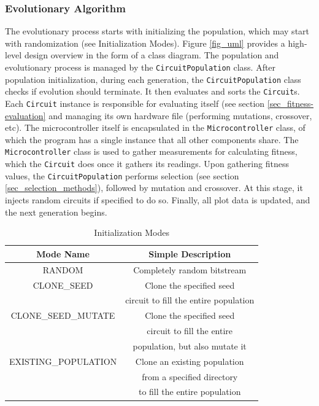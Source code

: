 \documentclass{ieeeaccess}
\begin{document}
\subsubsection{Evolutionary Algorithm}
The evolutionary process starts with initializing the population, which may start with randomization (see Initialization Modes). Figure \ref{fig_uml} provides a high-level design overview in the form of a class diagram. The population and evolutionary process is managed by the \texttt{CircuitPopulation} class. After population initialization, during each generation, the \texttt{CircuitPopulation} class checks if evolution should terminate. It then evaluates and sorts the \texttt{Circuit}s. Each \texttt{Circuit} instance is responsible for evaluating itself (see section \ref{sec_fitness-evaluation} and managing its own hardware file (performing mutations, crossover, etc). The microcontroller itself is encapsulated in the \texttt{Microcontroller} class, of which the program has a single instance that all other components share. The \texttt{Microcontroller} class is used to gather measurements for calculating fitness, which the \texttt{Circuit} does once it gathers its readings. Upon gathering fitness values, the \texttt{CircuitPopulation} performs selection (see section \ref{sec_selection_methods}), followed by mutation and crossover. At this stage, it injects random circuits if specified to do so. Finally, all plot data is updated, and the next generation begins.





\begin{table}[!ht]
\caption{Initialization Modes\label{tab:table_initmodes}}
\centering
\begin{tabular}{|c|c|}
\hline
\textbf{Mode Name} & \textbf{Simple Description}\\
\hline
RANDOM & Completely random bitstream \\
\hline
CLONE\_SEED & Clone the specified seed\\&circuit to fill the entire population \\
\hline
CLONE\_SEED\_MUTATE & Clone the specified seed \\&circuit to fill the entire\\&population, but also mutate it\\
\hline
EXISTING\_POPULATION & Clone an existing population  \\& from a specified directory \\& to  fill the entire population \\
\hline
\end{tabular}
\end{table}
\end{document}
